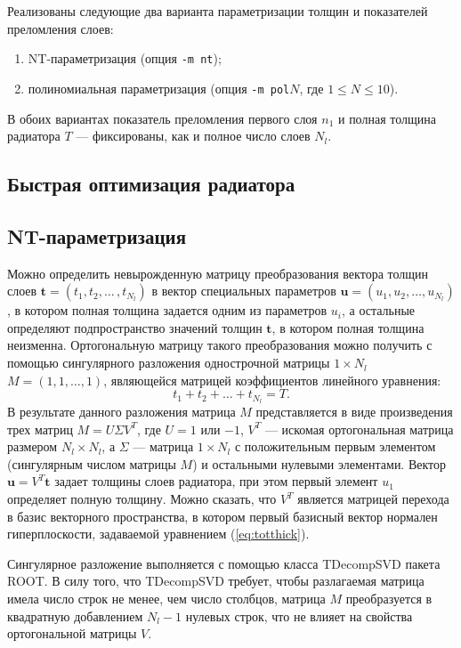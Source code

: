 \documentclass[12pt]{article}
\begin{document}
Реализованы следующие два варианта параметризации толщин и показателей преломления слоев:
\begin{enumerate}
\item NT-параметризация (опция {\tt -m nt});
\item полиномиальная параметризация (опция {\tt -m pol$N$}, где $1\leq N \leq 10$).
\end{enumerate}
В обоих вариантах показатель преломления первого слоя $n_1$ и полная толщина радиатора $T$ --- фиксированы, как и полное число слоев $N_l$.


\subsection{Быстрая оптимизация радиатора}


\subsection{NT-параметризация}
Можно определить невырожденную матрицу преобразования вектора толщин слоев $\boldsymbol{t}=(t_1,t_2,\ldots\,,t_{N_l})$ в вектор 
специальных параметров $\boldsymbol{u}=(u_1,u_2,\ldots,u_{N_l})$, в котором полная толщина задается одним из параметров $u_i$, 
а остальные определяют подпространство значений толщин $\boldsymbol{t}$, в котором полная толщина неизменна. 
Ортогональную матрицу такого преобразования можно получить с помощью сингулярного 
разложения однострочной матрицы $1\times N_l$ $M=(1,1,\ldots,1)$, являющейся матрицей коэффициентов линейного уравнения:
\begin{equation}
t_1+t_2+\ldots+t_{N_l} = T.
\label{eq:totthick}
\end{equation}
В результате данного разложения матрица $M$ представляется в виде произведения трех матриц $M=U\Sigma V^T$, где $U=1$ или $-1$,
$V^T$ --- искомая ортогональная матрица размером $N_l\times N_l$, а $\Sigma$ --- матрица $1\times N_l$ с положительным первым элементом (сингулярным числом матрицы $M$) и остальными 
нулевыми элементами. Вектор $\boldsymbol{u} = V^T \boldsymbol{t}$ задает толщины слоев радиатора, при этом первый элемент $u_1$ определяет полную толщину. 
Можно сказать, что $V^T$ является матрицей перехода в  базис векторного пространства, в котором первый базисный вектор нормален гиперплоскости, задаваемой уравнением (\ref{eq:totthick}).

Сингулярное разложение выполняется с помощью класса TDecompSVD пакета ROOT. В силу того, что TDecompSVD требует, чтобы разлагаемая матрица 
имела число строк не менее, чем число столбцов, матрица $M$ преобразуется в квадратную добавлением $N_l-1$ нулевых строк, что не влияет на свойства ортогональной матрицы $V$.
\end{document}
